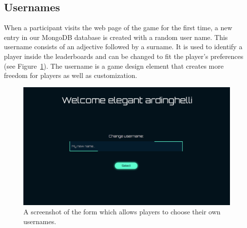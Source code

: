 \subsection*{Usernames}
When a participant visits the web page of the game for the first time, a new entry in our MongoDB database is created with a random user name. This username consists of an adjective followed by a surname. It is used to identify a player inside the leaderboards and can be changed to fit the player's preferences (see Figure~\ref{fig:username}). The username is a game design element that creates more freedom for players as well as customization.
\begin{figure}[h]
    \includegraphics[width=1.0\textwidth]{graphics/game/username (1).pdf}
    \caption{A screenshot of the form which allows players to choose their own usernames.}
    \label{fig:username}
\end{figure}

